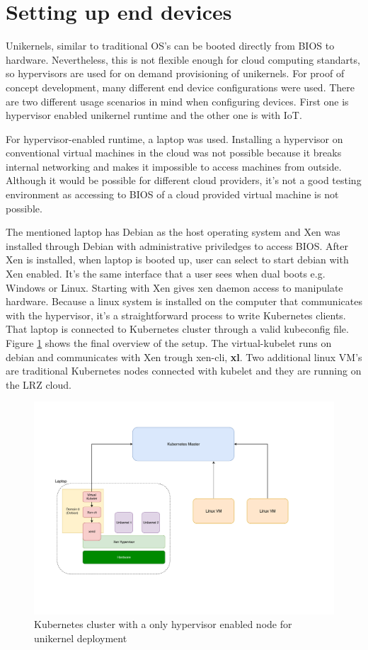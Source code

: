 \pagebreak
\section{Setting up end devices}
Unikernels, similar to traditional OS's can be booted directly from BIOS to hardware. Nevertheless, this is not flexible enough for cloud computing standarts, so hypervisors are used for on demand provisioning of unikernels. For proof of concept development, many different end device configurations were used. There are two different usage scenarios in mind when configuring devices. First one is hypervisor enabled unikernel runtime and the other one is with IoT.

For hypervisor-enabled runtime, a laptop was used. Installing a hypervisor on conventional virtual machines in the cloud was not possible because it breaks internal networking and makes it impossible to access machines from outside. Although it would be possible for different cloud providers, it's not a good testing environment as accessing to BIOS of a cloud provided virtual machine is not possible.

The mentioned laptop has Debian as the host operating system and Xen was installed through Debian with administrative priviledges to access BIOS. After Xen is installed, when laptop is booted up, user can select to start debian with Xen enabled. It's the same interface that a user sees when dual boots e.g. Windows or Linux. Starting with Xen gives xen daemon access to manipulate hardware. Because a linux system is installed on the computer that communicates with the hypervisor, it's a straightforward process to write Kubernetes clients. That laptop is connected to Kubernetes cluster through a valid kubeconfig file. Figure \ref{fig:hypervisor} shows the final overview of the setup. The virtual-kubelet runs on debian and communicates with Xen trough xen-cli, \textbf{xl}. Two additional linux VM's are traditional Kubernetes nodes connected with kubelet and they are running on the LRZ cloud.

\begin{figure}[htpb]
  
  \centering
  \includegraphics[width=1.2\textwidth]{figures/arch_new.pdf}
  \caption{ Kubernetes cluster with a only hypervisor enabled node for unikernel deployment} \label{fig:hypervisor}
\end{figure}


